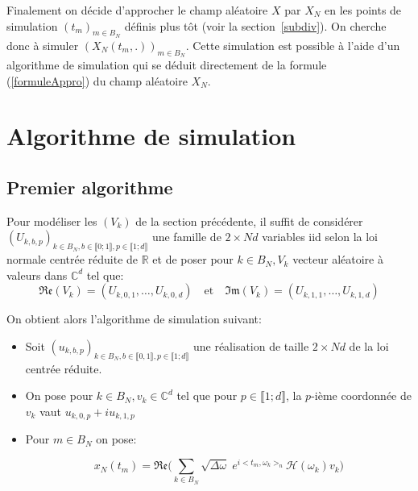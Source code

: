 Finalement on décide d'approcher le champ aléatoire $X$ par $X_N$ en les points de simulation $(t_m)_{m \in B_N}$ définis plus tôt (voir la section~\ref{subdiv}).
On cherche donc à simuler $(X_N(t_m,.))_{m \in B_N}$. Cette simulation est possible à l'aide d'un algorithme de simulation qui se déduit directement de la formule (\ref{formuleAppro}) du champ aléatoire $X_N$.

\section{Algorithme de simulation}

\subsection{Premier algorithme}
\label{firstone}
Pour modéliser les $(V_k)$ de la section précédente, il suffit de considérer $(U_{k,b,p})_{k \in B_N,  b \in \llbracket 0;1 \rrbracket, p \in \llbracket 1; d \rrbracket}$ une famille de $2\times Nd$ variables iid selon la loi normale centrée réduite de $\mathbb{R}$ et de poser pour $k \in B_N, V_k$ vecteur aléatoire à valeurs dans $\mathbb{C}^d$ tel que:
\begin{equation*}
  \mathfrak{Re}(V_k) = (U_{k,0,1}, \dots, U_{k,0,d}) \quad \text{et} \quad \mathfrak{Im}(V_k) = (U_{k,1,1}, \dots, U_{k,1,d})
\end{equation*}

\noindent On obtient alors l'algorithme de simulation suivant: 
\begin{itemize}
\item Soit $(u_{k,b,p})_{k \in B_N,  b \in \llbracket 0,1 \rrbracket, p \in \llbracket 1;d\rrbracket}$  une réalisation de taille $2\times Nd$ de la loi centrée réduite. 

\item On pose pour $k \in B_N, v_k \in \mathbb{C}^d$ tel que pour $p \in \llbracket 1;d\rrbracket$, la $p$-ième coordonnée de $v_k$ vaut $u_{k,0,p} + iu_{k,1,p}$

\item Pour $m \in B_N$ on pose:

   \begin{equation}x_N(t_m) = \mathfrak{Re}\biggl(\displaystyle\sum_{k \in B_N} \sqrt{\Delta\omega} \; e^{i<t_m,\omega_k>_{n}}\mathcal{H}(\omega_k)v_k \biggr) \label{formule1} \end{equation}

\end{itemize}


